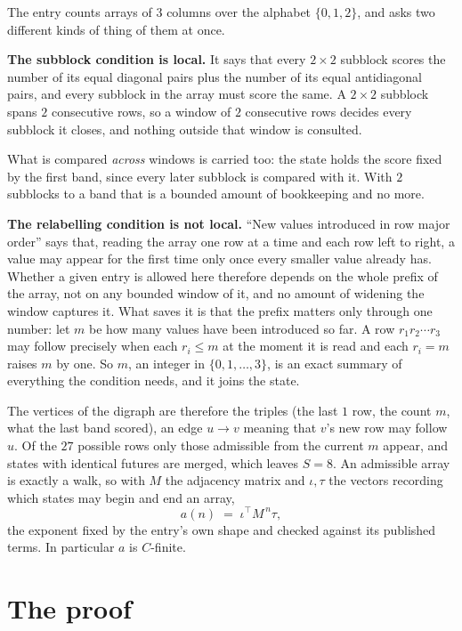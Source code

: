 \documentclass[11pt,a4paper]{article}
\theoremstyle{plain}
\theoremstyle{definition}
\begin{document}
The entry counts arrays of 3 columns over the alphabet $\{0,1,2\}$, and asks two different kinds of thing of them at once.

\textbf{The subblock condition is local.} It says that every $2\times2$ subblock scores the number of its equal diagonal pairs plus the number of its equal antidiagonal pairs, and every subblock in the array must score the same. A $ 2\times2$ subblock spans $2$ consecutive rows, so a window of $2$ consecutive rows decides every subblock it closes, and nothing outside that window is consulted.

What is compared \emph{across} windows is carried too: the state holds the score fixed by the first band, since every later subblock is compared with it. With $2$ subblocks to a band that is a bounded amount of bookkeeping and no more.

\textbf{The relabelling condition is not local.} ``New values introduced in row major order'' says that, reading the array one row at a time and each row left to right, a value may appear for the first time only once every smaller value already has. Whether a given entry is allowed here therefore depends on the whole prefix of the array, not on any bounded window of it, and no amount of widening the window captures it. What saves it is that the prefix matters only through one number: let $m$ be how many values have been introduced so far. A row $r_1r_2\cdots r_3$ may follow precisely when each $r_i\le m$ at the moment it is read and each $r_i=m$ raises $m$ by one. So $m$, an integer in $\{0,1,\dots,3\}$, is an exact summary of everything the condition needs, and it joins the state.

The vertices of the digraph are therefore the triples (the last $1$ row, the count $m$, what the last band scored), an edge $u\to v$ meaning that $v$'s new row may follow $u$. Of the $27$ possible rows only those admissible from the current $m$ appear, and states with identical futures are merged, which leaves $S=8$. An admissible array is exactly a walk, so with $M$ the adjacency matrix and $\iota,\tau$ the vectors recording which states may begin and end an array,
\[
a(n)\;=\;\iota^{\!\top}M^{\,n}\tau ,
\]
the exponent fixed by the entry's own shape and checked against its published terms. In
particular $a$ is $C$-finite.

\section{The proof}
\end{document}
